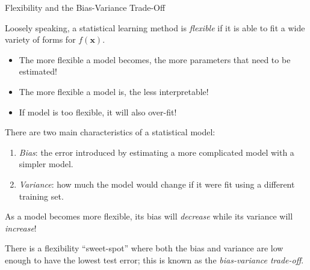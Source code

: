 \documentclass[8pt]{beamer}
\newcommand{\mydef}[1]{\textcolor{SteelBlue3}{\textit{#1}}} %
\begin{document}
\begin{frame}{Flexibility and the Bias-Variance Trade-Off}

Loosely speaking, a statistical learning method is \mydef{flexible} if it is able to fit a wide variety of forms for $f(\bm{x})$. %
\begin{itemize}
    \item The more flexible a model becomes, the more parameters that need to be estimated! %
    \item The more flexible a model is, the less interpretable! %
    \item If model is too flexible, it will also over-fit! %
\end{itemize}

There are two main characteristics of a statistical model: %
\begin{enumerate}
    \item \mydef{Bias}: the error introduced by estimating a more complicated model with a simpler model. %
    \item \mydef{Variance}: how much the model would change if it were fit using a different training set. %
\end{enumerate}

As a model becomes more flexible, its bias will \textit{decrease} while its variance will \textit{increase}! %

There is a flexibility ``sweet-spot'' where both the bias and variance are low enough to have the lowest test error; this is known as the \mydef{bias-variance trade-off}.
    
\end{frame}
\end{document}
